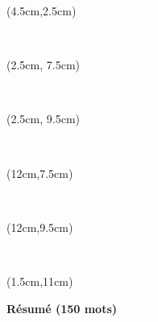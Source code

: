 \begin{titlepage}
    \thispagestyle{empty}

    

    \begin{textblock*}{12cm}(4.5cm,2.5cm)
        \begin{LARGE}
            \makeatletter
            \justifying
            \begin{center}
                \textbf{\textcolor{white}{\jobposition}}
                \\
                \textbf{\textcolor{white}{\thetitle}}
            \end{center}
            \makeatother
        \end{LARGE}
    \end{textblock*}

    \begin{textblock*}{10cm}(2.5cm, 7.5cm)
        \raggedright
        \large
        \textbf{\textcolor{white}{NOM Prénom}}
        \\
        \textbf{\textcolor{white}{\theauthor}}
    \end{textblock*}

    \begin{textblock*}{10cm}(2.5cm, 9.5cm)
        \raggedright
        \large
        \textbf{\textcolor{white}{Responsable Pédagogique}}
        \\
        \textbf{\textcolor{white}{\theRPeda}}
    \end{textblock*}


    \begin{textblock*}{10cm}(12cm,7.5cm)
        \raggedright
        \large
        \textbf{\textcolor{white}{Branche}}
        \\
        \begin{raggedleft}
            \textcolor{white}{\theUE}
        \end{raggedleft}
    \end{textblock*}

    \begin{textblock*}{10cm}(12cm,9.5cm)
        \large
        \raggedright
        \textbf{\textcolor{white}{Semestre}}
        \\
        \textcolor{white}{\theSemestre}
    \end{textblock*}

    \begin{textblock*}{18cm}(1.5cm,11cm)
        \begin{center}
            \normalsize
            \textbf{\textcolor{bleuRoiUTT}{Résumé (150 mots)}}
        \end{center}
    \end{textblock*}


\end{titlepage}
